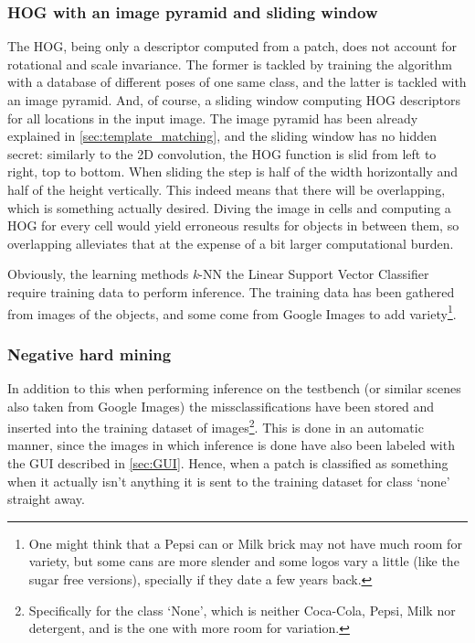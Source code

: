 \documentclass[../main.tex]{subfiles}
\begin{document}
\subsubsection{HOG with an image pyramid and sliding window}
The HOG, being only a descriptor computed from a patch, does not account for rotational and scale invariance. The former is tackled by training the algorithm with a database of different poses of one same class, and the latter is tackled with an image pyramid. And, of course, a sliding window computing HOG descriptors for all locations in the input image. The image pyramid has been already explained in \ref{sec:template_matching}, and the sliding window has no hidden secret: similarly to the 2D convolution, the HOG function is slid from left to right, top to bottom. When sliding the step is half of the width horizontally and half of the height vertically. This indeed means that there will be overlapping, which is something actually desired. Diving the image in cells and computing a HOG for every cell would yield erroneous results for objects in between them, so overlapping alleviates that at the expense of a bit larger computational burden.

Obviously, the learning methods \emph{k}-NN the Linear Support Vector Classifier require training data to perform inference. The training data has been gathered from images of the objects, and some come from Google Images to add variety\footnote{One might think that a Pepsi can or Milk brick may not have much room for variety, but some cans are more slender and some logos vary a little (like the sugar free versions), specially if they date a few years back.}. 

\subsubsection{Negative hard mining}
In addition to this when performing inference on the testbench (or similar scenes also taken from Google Images) the missclassifications have been stored and inserted into the training dataset of images\footnote{Specifically for the class `None', which is neither Coca-Cola, Pepsi, Milk nor detergent, and is the one with more room for variation.}. This is done in an automatic manner, since the images in which inference is done have also been labeled with the GUI described in \ref{sec:GUI}. Hence, when a patch is classified as something when it actually isn't anything it is sent to the training dataset for class `none' straight away. 
\end{document}
